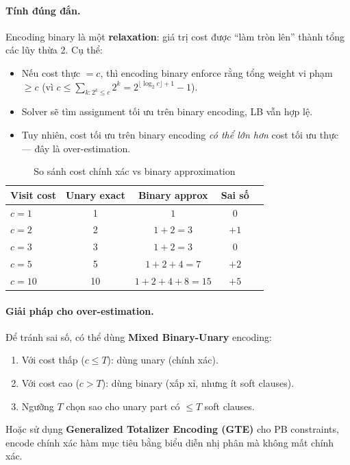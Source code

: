\documentclass[11pt,a4paper]{article}
\begin{document}
\paragraph{Tính đúng đắn.} Encoding binary là một \textbf{relaxation}: giá trị cost được ``làm tròn lên'' thành tổng các lũy thừa 2. Cụ thể:
\begin{itemize}
  \item Nếu cost thực $= c$, thì encoding binary enforce rằng tổng weight vi phạm $\geq c$ (vì $c \leq \sum_{k: 2^k \leq c} 2^k = 2^{\lfloor \log_2 c \rfloor + 1} - 1$).
  \item Solver sẽ tìm assignment tối ưu trên binary encoding, LB vẫn hợp lệ.
  \item Tuy nhiên, cost tối ưu trên binary encoding \emph{có thể lớn hơn} cost tối ưu thực --- đây là over-estimation.
\end{itemize}

\begin{table}[h]
\centering
\begin{tabular}{lcccc}
\toprule
\textbf{Visit cost} & \textbf{Unary exact} & \textbf{Binary approx} & \textbf{Sai số} \\
\midrule
$c = 1$ & 1 & $1$ & 0 \\
$c = 2$ & 2 & $1+2 = 3$ & $+1$ \\
$c = 3$ & 3 & $1+2 = 3$ & 0 \\
$c = 5$ & 5 & $1+2+4 = 7$ & $+2$ \\
$c = 10$ & 10 & $1+2+4+8 = 15$ & $+5$ \\
\bottomrule
\end{tabular}
\caption{So sánh cost chính xác vs binary approximation}
\end{table}

\paragraph{Giải pháp cho over-estimation.} Để tránh sai số, có thể dùng \textbf{Mixed Binary-Unary} encoding:
\begin{enumerate}
  \item Với cost thấp ($c \leq T$): dùng unary (chính xác).
  \item Với cost cao ($c > T$): dùng binary (xấp xỉ, nhưng ít soft clauses).
  \item Ngưỡng $T$ chọn sao cho unary part có $\leq T$ soft clauses.
\end{enumerate}

Hoặc sử dụng \textbf{Generalized Totalizer Encoding (GTE)} cho PB constraints, encode chính xác hàm mục tiêu bằng biểu diễn nhị phân mà không mất chính xác.
\end{document}
